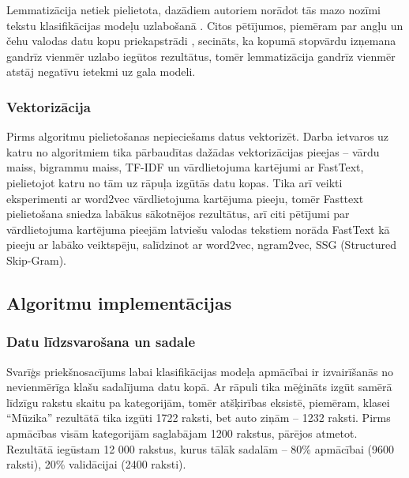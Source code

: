Lemmatizācija netiek pielietota, dazādiem autoriem norādot tās mazo nozīmi tekstu klasifikācijas modeļu uzlabošanā \cite{santos2023effect}. Citos pētījumos, piemēram par angļu un čehu valodas datu kopu priekapstrādi \cite{normalizationTextClassification}, secināts, ka kopumā stopvārdu izņemana gandrīz vienmēr uzlabo iegūtos rezultātus, tomēr lemmatizācija gandrīz vienmēr atstāj negatīvu ietekmi uz gala modeli.

\subsubsection{Vektorizācija}
Pirms algoritmu pielietošanas nepieciešams datus vektorizēt. Darba ietvaros uz katru no algoritmiem tika pārbaudītas dažādas vektorizācijas pieejas – vārdu maiss, bigrammu maiss, TF-IDF un vārdlietojuma kartējumi ar FastText, pielietojot katru no tām uz rāpuļa izgūtās datu kopas. Tika arī veikti eksperimenti ar word2vec vārdlietojuma kartējuma pieeju, tomēr Fasttext pielietošana sniedza labākus sākotnējos rezultātus, arī citi pētījumi par vārdlietojuma kartējuma pieejām latviešu valodas tekstiem \cite{LaucisJekabsonWordEmbedding} norāda FastText kā pieeju ar labāko veiktspēju, salīdzinot ar word2vec, ngram2vec, SSG (Structured Skip-Gram).

\subsection{Algoritmu implementācijas}

\subsubsection{Datu līdzsvarošana un sadale}
Svarīģs priekšnosacījums labai klasifikācijas modeļa apmācībai ir izvairīšanās no nevienmērīga klašu sadalījuma datu kopā. Ar rāpuli tika mēģināts izgūt samērā līdzīgu rakstu skaitu pa kategorijām, tomēr atšķirības eksistē, piemēram, klasei “Mūzika” rezultātā tika izgūti 1722 raksti, bet auto ziņām – 1232 raksti. Pirms apmācības visām kategorijām saglabājam 1200 rakstus, pārējos atmetot. Rezultātā iegūstam 12 000 rakstus, kurus tālāk sadalām – 80\% apmācībai (9600 raksti), 20\% validācijai (2400 raksti).

